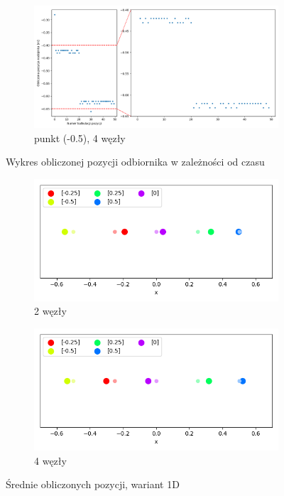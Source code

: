 \begin{figure}[H]
    \ContinuedFloat\centering
    \begin{subfigure}{\textwidth}
        \centering
        \includegraphics[width=\linewidth]{pics/mult_lat_1d/position_[-0.5]_4.png}
        \caption{punkt (-0.5), 4 węzły}
        \label{pic:1d_mult_[-0.5]_4}
    \end{subfigure}
    \caption{Wykres obliczonej pozycji odbiornika w zależności od czasu}
    \label{fig:1d_mult_separate}
\end{figure}

\begin{figure}[H]
    \centering
    \begin{subfigure}{.5\textwidth}
        \centering
        \includegraphics[width=\linewidth]{pics/mult_lat_1d/positions_2_mean.png}
        \caption{2 węzły}
        \label{pic:1d_2_mult}
    \end{subfigure}%
    \begin{subfigure}{.5\textwidth}
        \centering
        \includegraphics[width=\linewidth]{pics/mult_lat_1d/positions_4_mean.png}
        \caption{4 węzły}
        \label{pic:1d_4_mult}
    \end{subfigure}
    \caption{Średnie obliczonych pozycji, wariant 1D}
    \label{fig:1d_mult}
\end{figure}

